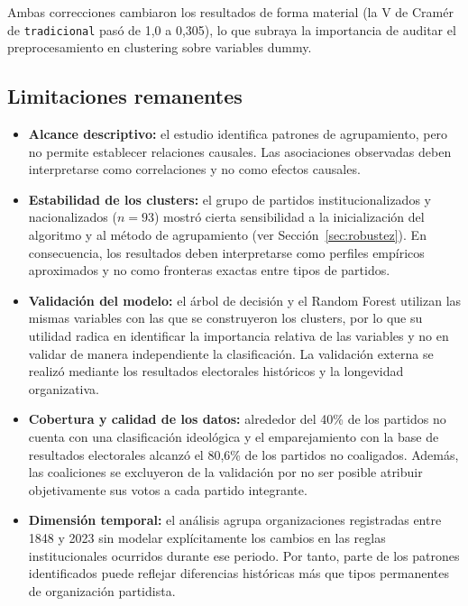 \documentclass[11pt,letterpaper]{article}
\newcommand{\code}[1]{\texttt{\small #1}}
\begin{document}
Ambas correcciones cambiaron los resultados de forma material (la V de Cramér de \code{tradicional} pasó de 1,0 a 0,305), lo que subraya la importancia de auditar el preprocesamiento en clustering sobre variables dummy.

\subsection{Limitaciones remanentes}

\begin{itemize}[topsep=0.3em,itemsep=0.35em]
  \item \textbf{Alcance descriptivo:} el estudio identifica patrones de agrupamiento, pero no permite establecer relaciones causales. Las asociaciones observadas deben interpretarse como correlaciones y no como efectos causales.
  \item \textbf{Estabilidad de los clusters:} el grupo de partidos institucionalizados y nacionalizados ($n=93$) mostró cierta sensibilidad a la inicialización del algoritmo y al método de agrupamiento (ver Sección~\ref{sec:robustez}). En consecuencia, los resultados deben interpretarse como perfiles empíricos aproximados y no como fronteras exactas entre tipos de partidos.
  \item \textbf{Validación del modelo:} el árbol de decisión y el Random Forest utilizan las mismas variables con las que se construyeron los clusters, por lo que su utilidad radica en identificar la importancia relativa de las variables y no en validar de manera independiente la clasificación. La validación externa se realizó mediante los resultados electorales históricos y la longevidad organizativa.
  \item \textbf{Cobertura y calidad de los datos:} alrededor del 40\% de los partidos no cuenta con una clasificación ideológica y el emparejamiento con la base de resultados electorales alcanzó el 80,6\% de los partidos no coaligados. Además, las coaliciones se excluyeron de la validación por no ser posible atribuir objetivamente sus votos a cada partido integrante.
  \item \textbf{Dimensión temporal:} el análisis agrupa organizaciones registradas entre 1848 y 2023 sin modelar explícitamente los cambios en las reglas institucionales ocurridos durante ese periodo. Por tanto, parte de los patrones identificados puede reflejar diferencias históricas más que tipos permanentes de organización partidista.
\end{itemize}
\end{document}
